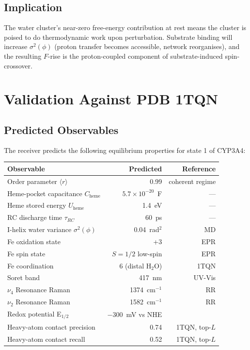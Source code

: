 \documentclass[11pt,twocolumn,a4paper]{article}
\theoremstyle{definition}
\theoremstyle{remark}
\newcommand{\orderpar}{\langle r \rangle}
\begin{document}
\subsection{Implication}

The water cluster's near-zero free-energy contribution at rest means the cluster is poised to do thermodynamic work upon perturbation. Substrate binding will increase $\sigma^2(\phi)$ (proton transfer becomes accessible, network reorganises), and the resulting $F$-rise is the proton-coupled component of substrate-induced spin-crossover.

\section{Validation Against PDB 1TQN}
\label{sec:resting_validation}

\subsection{Predicted Observables}

The receiver predicts the following equilibrium properties for state 1 of CYP3A4:

\begin{center}
\small
\begin{tabular}{lrr}
\toprule
\textbf{Observable} & \textbf{Predicted} & \textbf{Reference} \\
\midrule
Order parameter $\orderpar$ & 0.99 & coherent regime \\
Heme-pocket capacitance $C_{\mathrm{heme}}$ & $5.7 \times 10^{-20}$~F & --- \\
Heme stored energy $U_{\mathrm{heme}}$ & 1.4~eV & --- \\
RC discharge time $\tau_{RC}$ & 60~ps & --- \\
I-helix water variance $\sigma^2(\phi)$ & 0.04~rad$^2$ & MD \citep{kondev2018} \\
Fe oxidation state & +3 & EPR \citep{guengerich2018} \\
Fe spin state & $S = 1/2$ low-spin & EPR \\
Fe coordination & 6 (distal H$_2$O) & 1TQN \\
Soret band & 417~nm & UV-Vis \\
$\nu_4$ Resonance Raman & 1374~cm$^{-1}$ & RR \citep{egawa1991} \\
$\nu_2$ Resonance Raman & 1582~cm$^{-1}$ & RR \\
Redox potential E$_{1/2}$ & $-300$~mV vs NHE & \citep{daff1997} \\
Heavy-atom contact precision & 0.74 & 1TQN, top-$L$ \\
Heavy-atom contact recall & 0.52 & 1TQN, top-$L$ \\
\bottomrule
\end{tabular}
\end{center}
\end{document}

